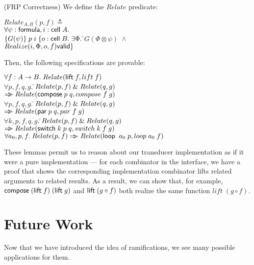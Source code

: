 \begin{prop}{(FRP Correctness)}
We define the $Relate$ predicate:
\begin{tabbing}
$Relate_{A,B}(p, f) \triangleq$ \\
\;\; $\forall \psi:\mathsf{formula}, i:\mathsf{cell}\;{A}.$ \\ 
\qquad $\{{G(\psi)}\}\;p\;i\;\{o:\mathsf{cell}\;{B}.\;
               \exists \Phi.\;$\=$G(\Phi \otimes \psi) \;\land$ \\
                               \>$ Realize(i, \Phi, o, f) \mathsf{ valid}\}$
\end{tabbing}
\noindent Then, the following specifications are provable: 
\begin{tabbing}
$\forall f:A\to B.\; Relate(\mathsf{lift}\; f, lift\;f)$ \\[1em]

$\forall p, f, q, g.\;$\=$Relate(p, f) \;\&\; Relate(q, g)$ \\
                       \>$\Rightarrow\!\!\!> Relate(\mathsf{compose}\; p\;q, compose\;f\;g)$ \\[1em]

$\forall p, f, q, g.\;$\=$Relate(p, f) \;\&\; Relate(q, g)$ \\
                       \>$\Rightarrow\!\!\!> Relate(\mathsf{par}\; p\;q, par\;f\;g)$ \\[1em]

$\forall k, p, f, q, g.\;$\=$Relate(p, f) \;\&\; Relate(q, g)$ \\
                          \>$\Rightarrow\!\!\!> Relate(\mathsf{switch}\; k\;p\;q, switch\;k\;f\;g)$ \\[1em]

$\forall a_0, p, f.\; 
  Relate(p, f) \Rightarrow\!\!\!> Relate(\mathsf{loop}\;\;a_0\;p, loop\;a_0\;f)$
\end{tabbing}
\end{prop}

These lemmas permit us to reason about our transducer implementation
as if it were a pure implementation --- for each combinator in the
interface, we have a proof that shows the corresponding implementation
combinator lifts related arguments to related results. As a result, 
we can show that, for example, $\mathsf{compose}\; (\mathsf{lift}\; f) \;(\mathsf{lift}\; g)$
and $\mathsf{lift}\; (g \circ f)$ both realize the same function $lift\;(g\circ f)$. 

\section{Future Work}

Now that we have introduced the idea of ramifications, we see many
possible applications for them. 

